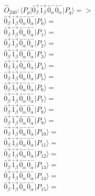 \documentclass[14pt]{article}
\begin{document}
    $\hat{O}_{240}:  \langle{P_p}\vert \hat{0}_{\beta}^{+}\hat{1}_{\beta}^{+}\hat{0}_{\alpha}^{-}\hat{0}_{\alpha}^{-} \vert{P_q}\rangle => $ \\ 
    $ \hat{0}_{\beta}^{+}\hat{1}_{\beta}^{+}\hat{0}_{\alpha}^{-}\hat{0}_{\alpha}^{-} \vert{P_{0}}\rangle =  $ \\ 
    $ \hat{0}_{\beta}^{+}\hat{1}_{\beta}^{+}\hat{0}_{\alpha}^{-}\hat{0}_{\alpha}^{-} \vert{P_{1}}\rangle =  $ \\ 
    $ \hat{0}_{\beta}^{+}\hat{1}_{\beta}^{+}\hat{0}_{\alpha}^{-}\hat{0}_{\alpha}^{-} \vert{P_{2}}\rangle =  $ \\ 
    $ \hat{0}_{\beta}^{+}\hat{1}_{\beta}^{+}\hat{0}_{\alpha}^{-}\hat{0}_{\alpha}^{-} \vert{P_{3}}\rangle =  $ \\ 
    $ \hat{0}_{\beta}^{+}\hat{1}_{\beta}^{+}\hat{0}_{\alpha}^{-}\hat{0}_{\alpha}^{-} \vert{P_{4}}\rangle =  $ \\ 
    $ \hat{0}_{\beta}^{+}\hat{1}_{\beta}^{+}\hat{0}_{\alpha}^{-}\hat{0}_{\alpha}^{-} \vert{P_{5}}\rangle =  $ \\ 
    $ \hat{0}_{\beta}^{+}\hat{1}_{\beta}^{+}\hat{0}_{\alpha}^{-}\hat{0}_{\alpha}^{-} \vert{P_{6}}\rangle =  $ \\ 
    $ \hat{0}_{\beta}^{+}\hat{1}_{\beta}^{+}\hat{0}_{\alpha}^{-}\hat{0}_{\alpha}^{-} \vert{P_{7}}\rangle =  $ \\ 
    $ \hat{0}_{\beta}^{+}\hat{1}_{\beta}^{+}\hat{0}_{\alpha}^{-}\hat{0}_{\alpha}^{-} \vert{P_{8}}\rangle =  $ \\ 
    $ \hat{0}_{\beta}^{+}\hat{1}_{\beta}^{+}\hat{0}_{\alpha}^{-}\hat{0}_{\alpha}^{-} \vert{P_{9}}\rangle =  $ \\ 
    $ \hat{0}_{\beta}^{+}\hat{1}_{\beta}^{+}\hat{0}_{\alpha}^{-}\hat{0}_{\alpha}^{-} \vert{P_{10}}\rangle =  $ \\ 
    $ \hat{0}_{\beta}^{+}\hat{1}_{\beta}^{+}\hat{0}_{\alpha}^{-}\hat{0}_{\alpha}^{-} \vert{P_{11}}\rangle =  $ \\ 
    $ \hat{0}_{\beta}^{+}\hat{1}_{\beta}^{+}\hat{0}_{\alpha}^{-}\hat{0}_{\alpha}^{-} \vert{P_{12}}\rangle =  $ \\ 
    $ \hat{0}_{\beta}^{+}\hat{1}_{\beta}^{+}\hat{0}_{\alpha}^{-}\hat{0}_{\alpha}^{-} \vert{P_{13}}\rangle =  $ \\ 
    $ \hat{0}_{\beta}^{+}\hat{1}_{\beta}^{+}\hat{0}_{\alpha}^{-}\hat{0}_{\alpha}^{-} \vert{P_{14}}\rangle =  $ \\ 
    $ \hat{0}_{\beta}^{+}\hat{1}_{\beta}^{+}\hat{0}_{\alpha}^{-}\hat{0}_{\alpha}^{-} \vert{P_{15}}\rangle =  $ \\ 
    
\end{document}
